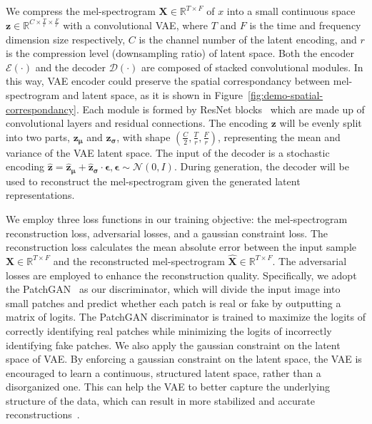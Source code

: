 We compress the mel-spectrogram $\boldsymbol{X}\in \mathbb{R}^{T\times F}$ of $x$ into a small continuous space $\boldsymbol{z}\in \mathbb{R}^{C\times \frac{T}{r}\times \frac{F}{r}}$ with a convolutional VAE, where $T$ and $F$ is the time and frequency dimension size respectively, $C$ is the channel number of the latent encoding, and $r$ is the compression level (downsampling ratio) of latent space. Both the encoder $\mathcal{E}(\cdot)$ and the decoder $\mathcal{D}(\cdot)$ are composed of stacked convolutional modules. In this way, VAE encoder could preserve the spatial correspondancy between mel-spectrogram and latent space, as it is shown in Figure~\ref{fig:demo-spatial-correspondancy}. Each module is formed by ResNet blocks~\cite{kong2021decoupling} which are made up of convolutional layers and residual connections. The encoding $\boldsymbol{z}$ will be evenly split into two parts, $\boldsymbol{z}_{\boldsymbol{\mu}}$ and $\boldsymbol{z}_{\boldsymbol{\sigma}}$, with shape $(\frac{C}{2}, \frac{T}{r}, \frac{F}{r})$, representing the mean and variance of the VAE latent space. The input of the decoder is a stochastic encoding $\boldsymbol{\hat{z}}=\boldsymbol{\hat{z}}_{\boldsymbol{\mu}}+\boldsymbol{\hat{z}}_{\boldsymbol{\sigma}} \cdot \boldsymbol{\epsilon}, \boldsymbol{\epsilon} \sim \mathcal{N}(0, I)$. During generation, the decoder will be used to reconstruct the mel-spectrogram given the generated latent representations.

We employ three loss functions in our training objective: the mel-spectrogram reconstruction loss, adversarial losses, and a gaussian constraint loss. The reconstruction loss calculates the mean absolute error between the input sample $\boldsymbol{X}\in \mathbb{R}^{T\times F}$ and the reconstructed mel-spectrogram $\hat{\boldsymbol{X}}\in \mathbb{R}^{T\times F}$. The adversarial losses are employed to enhance the reconstruction quality. Specifically, we adopt the PatchGAN~\citep{isola2017image} as our discriminator, which will divide the input image into small patches and predict whether each patch is real or fake by outputting a matrix of logits. 
The PatchGAN discriminator is trained to maximize the logits of correctly identifying real patches while minimizing the logits of incorrectly identifying fake patches. We also apply the gaussian constraint on the latent space of VAE. By enforcing a gaussian constraint on the latent space, the VAE is encouraged to learn a continuous, structured latent space, rather than a disorganized one. This can help the VAE to better capture the underlying structure of the data, which can result in more stabilized and accurate reconstructions~\cite{kingma2013auto}. 

